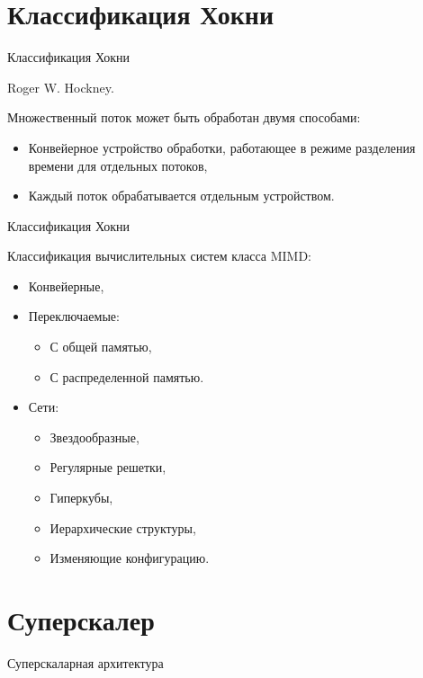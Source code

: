 \section{Классификация Хокни}

\begin{frame}{Классификация Хокни}

Roger W. Hockney.

Множественный поток может быть обработан двумя способами:

\begin{itemize}
    \item Конвейерное устройство обработки, работающее в режиме разделения
    времени для отдельных потоков,
    \item Каждый поток обрабатывается отдельным устройством.
\end{itemize}

\end{frame}

\begin{frame}{Классификация Хокни}

Классификация вычислительных систем класса MIMD:

\begin{itemize}
    \item Конвейерные,
    \item Переключаемые:
    \begin{itemize}
        \item С общей памятью,
        \item С распределенной памятью.
    \end{itemize}
    \item Сети:
    \begin{itemize}
        \item Звездообразные,
        \item Регулярные решетки,
        \item Гиперкубы,
        \item Иерархические структуры,
        \item Изменяющие конфигурацию.
    \end{itemize}
\end{itemize}
\end{frame}

\section{Суперскалер}

\begin{frame}{Суперскаларная архитектура}
\end{frame}

